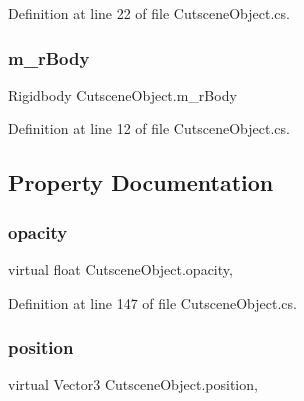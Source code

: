 Definition at line 22 of file Cutscene\+Object.\+cs.

\mbox{\label{class_cutscene_object_a0f2d7168764e754d26214b5631f29193}} 
\subsubsection{\texorpdfstring{m\+\_\+r\+Body}{m\_rBody}}
{\footnotesize\ttfamily Rigidbody Cutscene\+Object.\+m\+\_\+r\+Body}



Definition at line 12 of file Cutscene\+Object.\+cs.



\subsection{Property Documentation}
\mbox{\label{class_cutscene_object_a512dbfaffb59e8908a78fa1feb559839}} 
\subsubsection{\texorpdfstring{opacity}{opacity}}
{\footnotesize\ttfamily virtual float Cutscene\+Object.\+opacity\hspace{0.3cm}{\ttfamily [get]}, {\ttfamily [set]}}



Definition at line 147 of file Cutscene\+Object.\+cs.

\mbox{\label{class_cutscene_object_a95de90a33a7c318d3a8009897ed5013c}} 
\subsubsection{\texorpdfstring{position}{position}}
{\footnotesize\ttfamily virtual Vector3 Cutscene\+Object.\+position\hspace{0.3cm}{\ttfamily [get]}, {\ttfamily [set]}}



